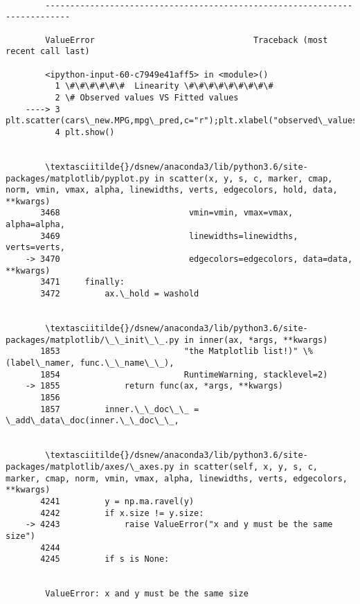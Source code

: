 \documentclass[11pt]{article}
\begin{document}
    \begin{Verbatim}[commandchars=\\\{\}]

        ---------------------------------------------------------------------------

        ValueError                                Traceback (most recent call last)

        <ipython-input-60-c7949e41aff5> in <module>()
          1 \#\#\#\#\#\#  Linearity \#\#\#\#\#\#\#\#\#
          2 \# Observed values VS Fitted values
    ----> 3 plt.scatter(cars\_new.MPG,mpg\_pred,c="r");plt.xlabel("observed\_values");plt.ylabel("fitted\_values")
          4 plt.show()


        \textasciitilde{}/dsnew/anaconda3/lib/python3.6/site-packages/matplotlib/pyplot.py in scatter(x, y, s, c, marker, cmap, norm, vmin, vmax, alpha, linewidths, verts, edgecolors, hold, data, **kwargs)
       3468                          vmin=vmin, vmax=vmax, alpha=alpha,
       3469                          linewidths=linewidths, verts=verts,
    -> 3470                          edgecolors=edgecolors, data=data, **kwargs)
       3471     finally:
       3472         ax.\_hold = washold


        \textasciitilde{}/dsnew/anaconda3/lib/python3.6/site-packages/matplotlib/\_\_init\_\_.py in inner(ax, *args, **kwargs)
       1853                         "the Matplotlib list!)" \% (label\_namer, func.\_\_name\_\_),
       1854                         RuntimeWarning, stacklevel=2)
    -> 1855             return func(ax, *args, **kwargs)
       1856 
       1857         inner.\_\_doc\_\_ = \_add\_data\_doc(inner.\_\_doc\_\_,


        \textasciitilde{}/dsnew/anaconda3/lib/python3.6/site-packages/matplotlib/axes/\_axes.py in scatter(self, x, y, s, c, marker, cmap, norm, vmin, vmax, alpha, linewidths, verts, edgecolors, **kwargs)
       4241         y = np.ma.ravel(y)
       4242         if x.size != y.size:
    -> 4243             raise ValueError("x and y must be the same size")
       4244 
       4245         if s is None:


        ValueError: x and y must be the same size

    \end{Verbatim}

    \begin{center}
    \end{center}
    { \hspace*{\fill} \\}
    
\end{document}
